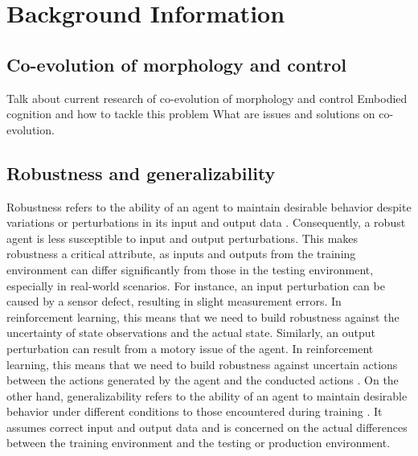 \section{Background Information}
\subsection{Co-evolution of morphology and control}
Talk about current research of co-evolution of morphology and control
Embodied cognition and how to tackle this problem
What are issues and solutions on co-evolution.


\subsection{Robustness and generalizability}
Robustness refers to the ability of an agent to maintain desirable behavior despite variations or perturbations in its input and output data \cite{Ravi_Mangal_2019, Charles_Packer_2019, Xu_Mengdi_2022}. Consequently, a robust agent is less susceptible to input and output perturbations. This makes robustness a critical attribute, as inputs and outputs from the training environment can differ significantly from those in the testing environment, especially in real-world scenarios. For instance, an input perturbation can be caused by a sensor defect, resulting in slight measurement errors. In reinforcement learning, this means that we need to build robustness against the uncertainty of state observations and the actual state. Similarly, an output perturbation can result from a motory issue of the agent. In reinforcement learning, this means that we need to build robustness against uncertain actions between the actions generated by the agent and the conducted actions \cite{Xu_Mengdi_2022}. On the other hand, generalizability refers to the ability of an agent to maintain desirable behavior under different conditions to those encountered during training \cite{Charles_Packer_2019,Xu_Mengdi_2022}. It assumes correct input and output data and is concerned on the actual differences between the training environment and the testing or production environment.